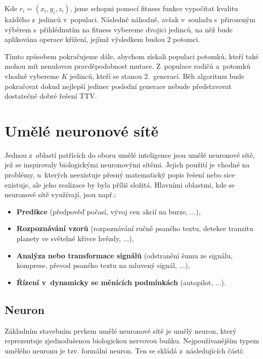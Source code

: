 \documentclass[a4paper,12pt]{article}
\begin{document}
{{{Kde $r_i = (x_i, y_i, z_i)$, jsme schopni pomocí fitness funkce vypočítat kvalitu každého z~jedinců v~populaci. Následně náhodně, avšak v~souladu s~přirozeným výběrem s~přihlédnutím na fitness vybereme dvojici jedinců, na něž bude aplikována operace křížení, jejímž výsledkem budou 2 potomci.~\cite{ttv}

Tímto způsobem pokračujeme dále, abychom získali populaci potomků, kteří také mohou mít nenulovou pravděpodobnost mutace. Z~populace rodičů a~potomků vhodně vybereme $K$ jedinců, kteří se stanou 2.~generací. Běh algoritmu bude pokračovat dokud nejlepší jedinec poslední generace nebude představovat dostatečně dobré řešení TTV.

\drawgimp

\section{Umělé neuronové sítě}

Jednou z~oblastí patřících do oboru umělé inteligence jsou umělé neuronové sítě, jež se inspirovaly biologickými neuronovými sítěmi. Jejich použití je vhodné na problémy, u~kterých neexistuje přesný matematický popis řešení nebo sice existuje, ale jeho realizace by byla příliš složitá. Hlavními oblastmi, kde se neuronové sítě využívají, jsou např.:

\begin{itemize}
\item \textbf{Predikce} (předpověď počasí,  vývoj cen akcií na burze, ...),

\item \textbf{Rozpoznávání vzorů} (rozpoznávání ručně psaného textu, detekce tranzitu planety ve světelné křivce hvězdy, ...),

\item \textbf{Analýza nebo transformace signálů} (odstranění šumu ze signálu, komprese, převod psaného textu na mluvený signál, ...),

\item \textbf{Řízení v~dynamicky se měnících podmínkách} (autopilot, ...).~\cite{nn}

\end{itemize}

\subsection{Neuron}

Základním stavebním prvkem umělé neuronové sítě je umělý neuron, který reprezentuje zjednodušenou biologickou nervovou buňku. Nejpoužívanějším typem umělého neuronu je tzv. formální neuron. Ten se skládá z~následujících částí:

}}}
\end{document}
